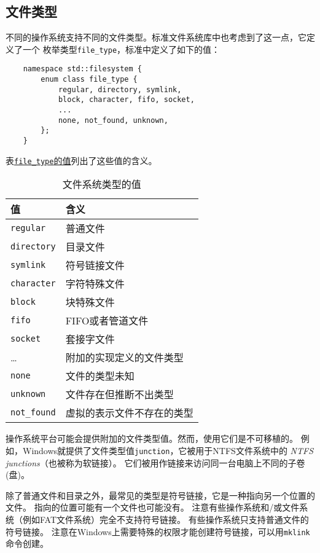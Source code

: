 \subsection{文件类型}\label{ch20.2.7}
不同的操作系统支持不同的文件类型。标准文件系统库中也考虑到了这一点，它定义了一个
枚举类型\texttt{file\_type}，标准中定义了如下的值：
\begin{lstlisting}
    namespace std::filesystem {
        enum class file_type {
            regular, directory, symlink,
            block, character, fifo, socket,
            ...
            none, not_found, unknown,
        };
    }
\end{lstlisting}
表\hyperref[t20.2]{\texttt{file\_type}的值}列出了这些值的含义。
\begin{table}[htb]
    \centering
    \begin{tabular}{l|l}
        \hline
        \textbf{值}          & \textbf{含义}   \\
        \hline
        \texttt{regular}    & 普通文件          \\
        \texttt{directory}  & 目录文件          \\
        \texttt{symlink}    & 符号链接文件        \\
        \texttt{character}  & 字符特殊文件        \\
        \texttt{block}      & 块特殊文件         \\
        \texttt{fifo}       & FIFO或者管道文件    \\
        \texttt{socket}     & 套接字文件         \\
        \ldots              & 附加的实现定义的文件类型  \\
        \texttt{none}       & 文件的类型未知       \\
        \texttt{unknown}    & 文件存在但推断不出类型   \\
        \texttt{not\_found} & 虚拟的表示文件不存在的类型 \\
        \hline
    \end{tabular}
    \caption{文件系统类型的值}
    \label{t20.2}
\end{table}

操作系统平台可能会提供附加的文件类型值。然而，使用它们是不可移植的。
例如，Windows就提供了文件类型值\texttt{junction}，它被用于NTFS文件系统中的
\emph{NTFS junctions}（也被称为软链接）。
它们被用作链接来访问同一台电脑上不同的子卷(盘)。\label{junction}

除了普通文件和目录之外，最常见的类型是符号链接，它是一种指向另一个位置的文件。
指向的位置可能有一个文件也可能没有。
注意有些操作系统和/或文件系统（例如FAT文件系统）完全不支持符号链接。
有些操作系统只支持普通文件的符号链接。
注意在Windows上需要特殊的权限才能创建符号链接，可以用\texttt{mklink}命令创建。

